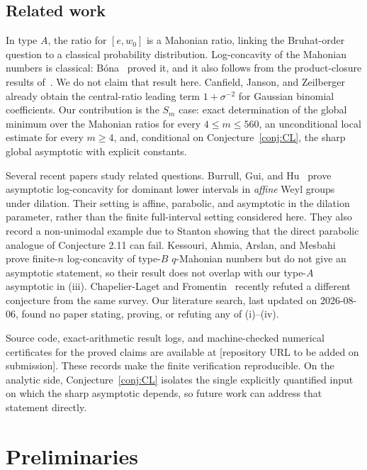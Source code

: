 \documentclass[11pt]{amsart}
\theoremstyle{plain}
\theoremstyle{definition}
\theoremstyle{remark}
\begin{document}
\subsection*{Related work} In type $A$, the ratio for $[e,w_0]$ is a
Mahonian ratio, linking the Bruhat-order question to a classical
probability distribution. Log-concavity of the Mahonian numbers is
classical: B\'ona~\cite{bona2004} proved it, and it also follows from the
product-closure results of~\cite{hoggar1974,kook2006}. We do not claim that
result here. Canfield, Janson, and Zeilberger~\cite{cjz2011} already obtain
the central-ratio leading term $1+\sigma^{-2}$ for Gaussian binomial
coefficients. Our contribution is the $S_m$ case: exact determination of
the global minimum over the Mahonian ratios for every $4\le m\le560$, an
unconditional local estimate for every $m\ge4$, and, conditional on
Conjecture~\ref{conj:CL}, the sharp global asymptotic with explicit
constants.

Several recent papers study related questions.
Burrull, Gui, and Hu~\cite{burrull-gui-hu} prove asymptotic
log-concavity for dominant lower intervals in \emph{affine} Weyl groups
under dilation. Their setting is affine, parabolic, and asymptotic in the
dilation parameter, rather than the finite full-interval setting considered
here. They also record a non-unimodal example due to Stanton showing that
the direct parabolic analogue of Conjecture 2.11 can fail. Kessouri, Ahmia,
Arslan, and Mesbahi~\cite{kessouri2024} prove finite-$n$ log-concavity of
type-$B$ $q$-Mahonian numbers but do not give an asymptotic statement, so
their result does not overlap with our type-$A$ asymptotic in (iii). Chapelier-Laget and Fromentin~\cite{chapelier-fromentin} recently refuted
a different conjecture from the same survey. Our literature search, last
updated on 2026-08-06, found no paper stating, proving, or refuting any of
(i)--(iv).

Source code, exact-arithmetic result logs, and machine-checked numerical
certificates for the proved claims are available at
[repository URL to be added on submission]. These records make the finite
verification reproducible. On the analytic side,
Conjecture~\ref{conj:CL} isolates the single explicitly quantified input on
which the sharp asymptotic depends, so future work can address that
statement directly.

\section{Preliminaries}
\label{sec:prelim}
\end{document}
